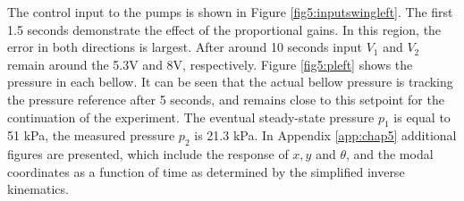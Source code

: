 The control input to the pumps is shown in Figure \ref{fig5:inputswingleft}. The first 1.5 seconds demonstrate the effect of the proportional gains. In this region, the error in both directions is largest. After around 10 seconds input $V_1$ and $V_2$ remain around the 5.3V and 8V, respectively. Figure \ref{fig5:pleft} shows the pressure in each bellow. It can be seen that the actual bellow pressure is tracking the pressure reference after 5 seconds, and remains close to this setpoint for the continuation of the experiment. The eventual steady-state pressure $p_1$ is equal to 51 kPa, the measured pressure $p_2$ is 21.3 kPa. In Appendix \ref{app:chap5} additional figures are presented, which include the response of $x,y$ and $\theta$, and the modal coordinates as a function of time as determined by the simplified inverse kinematics. 


